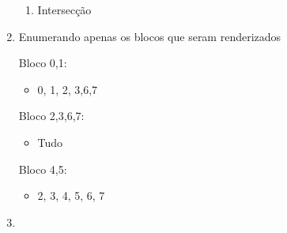 \begin{enumerate}[label=\arabic*)]
\begin{enumerate}[label=\alph*)]
			\item Intersecção	
		\end{enumerate}				
		
		\newpage

		\item Enumerando apenas os blocos que seram renderizados

		Bloco 0,1:
		\begin{itemize}
			\item 0, 1, 2, 3,6,7
		\end{itemize}

		Bloco 2,3,6,7:
		\begin{itemize}
			\item Tudo
		\end{itemize}

		Bloco 4,5:
		\begin{itemize}
			\item 2, 3, 4, 5, 6, 7
		\end{itemize}

		\item 
	\end{enumerate}
	
\newpage
